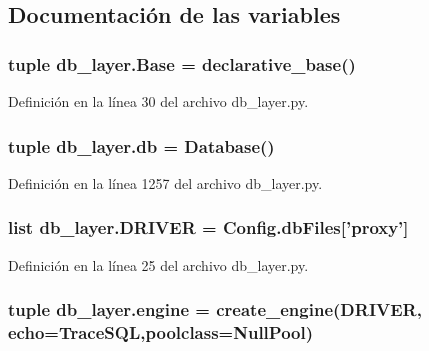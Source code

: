 \subsection{Documentación de las variables}
\hypertarget{namespacedb__layer_abf9d884063baa5841f513855cff66c26}{
\subsubsection[{Base}]{\setlength{\rightskip}{0pt plus 5cm}tuple db\-\_\-layer.\-Base = declarative\-\_\-base()}}\label{namespacedb__layer_abf9d884063baa5841f513855cff66c26}


Definición en la línea 30 del archivo db\-\_\-layer.\-py.

\hypertarget{namespacedb__layer_a566ad0b24ebd9510b8017f700f4540b5}{
\subsubsection[{db}]{\setlength{\rightskip}{0pt plus 5cm}tuple db\-\_\-layer.\-db = {\bf Database}()}}\label{namespacedb__layer_a566ad0b24ebd9510b8017f700f4540b5}


Definición en la línea 1257 del archivo db\-\_\-layer.\-py.

\hypertarget{namespacedb__layer_a7ed1ca76a740523975d0736208ae1f65}{
\subsubsection[{D\-R\-I\-V\-E\-R}]{\setlength{\rightskip}{0pt plus 5cm}list db\-\_\-layer.\-D\-R\-I\-V\-E\-R = {\bf Config.\-db\-Files}\mbox{[}'proxy'\mbox{]}}}\label{namespacedb__layer_a7ed1ca76a740523975d0736208ae1f65}


Definición en la línea 25 del archivo db\-\_\-layer.\-py.

\hypertarget{namespacedb__layer_ad6378d01c39f29fff5832fab694e3a9f}{
\subsubsection[{engine}]{\setlength{\rightskip}{0pt plus 5cm}tuple db\-\_\-layer.\-engine = create\-\_\-engine({\bf D\-R\-I\-V\-E\-R}, echo={\bf Trace\-S\-Q\-L},poolclass=Null\-Pool)}}\label{namespacedb__layer_ad6378d01c39f29fff5832fab694e3a9f}



